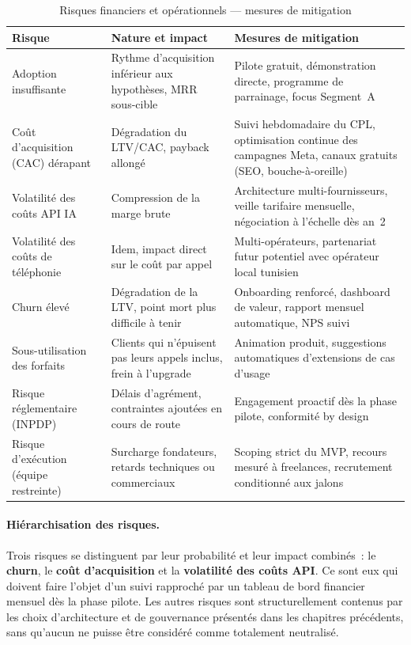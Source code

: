 \begin{table}[H]
\centering
\caption{Risques financiers et opérationnels — mesures de mitigation}
\label{tab:risques}
\begin{tabular}{|p{3.5cm}|p{4cm}|p{6cm}|}
\hline
\textbf{Risque} & \textbf{Nature et impact} & \textbf{Mesures de mitigation} \\
\hline
Adoption insuffisante & Rythme d'acquisition inférieur aux hypothèses, MRR sous-cible & Pilote gratuit, démonstration directe, programme de parrainage, focus Segment~A \\
\hline
Coût d'acquisition (CAC) dérapant & Dégradation du LTV/CAC, payback allongé & Suivi hebdomadaire du CPL, optimisation continue des campagnes Meta, canaux gratuits (SEO, bouche-à-oreille) \\
\hline
Volatilité des coûts API IA & Compression de la marge brute & Architecture multi-fournisseurs, veille tarifaire mensuelle, négociation à l'échelle dès an~2 \\
\hline
Volatilité des coûts de téléphonie & Idem, impact direct sur le coût par appel & Multi-opérateurs, partenariat futur potentiel avec opérateur local tunisien \\
\hline
Churn élevé & Dégradation de la LTV, point mort plus difficile à tenir & Onboarding renforcé, dashboard de valeur, rapport mensuel automatique, NPS suivi \\
\hline
Sous-utilisation des forfaits & Clients qui n'épuisent pas leurs appels inclus, frein à l'upgrade & Animation produit, suggestions automatiques d'extensions de cas d'usage \\
\hline
Risque réglementaire (INPDP) & Délais d'agrément, contraintes ajoutées en cours de route & Engagement proactif dès la phase pilote, conformité by design \\
\hline
Risque d'exécution (équipe restreinte) & Surcharge fondateurs, retards techniques ou commerciaux & Scoping strict du MVP, recours mesuré à freelances, recrutement conditionné aux jalons \\
\hline
\end{tabular}
\end{table}

\paragraph{Hiérarchisation des risques.} Trois risques se distinguent par leur probabilité et leur impact combinés~: le \textbf{churn}, le \textbf{coût d'acquisition} et la \textbf{volatilité des coûts API}. Ce sont eux qui doivent faire l'objet d'un suivi rapproché par un tableau de bord financier mensuel dès la phase pilote. Les autres risques sont structurellement contenus par les choix d'architecture et de gouvernance présentés dans les chapitres précédents, sans qu'aucun ne puisse être considéré comme totalement neutralisé.

